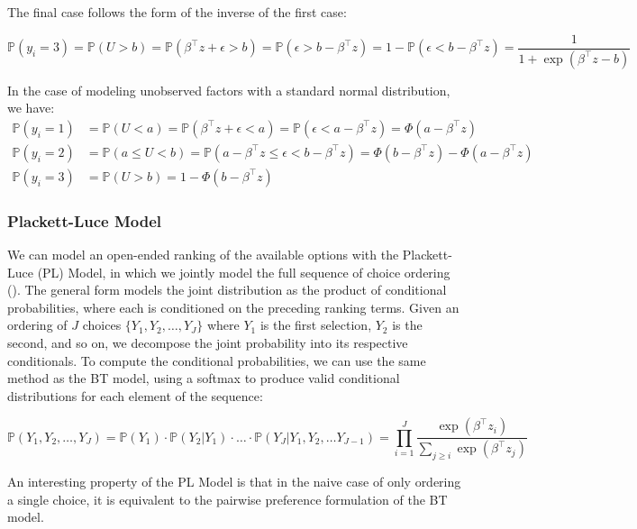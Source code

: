 \documentclass[
  letterpaper,
  numbers=noenddot,
  DIV=11]{scrreprt}
\theoremstyle{definition}
\theoremstyle{plain}
\theoremstyle{plain}
\theoremstyle{remark}
\begin{document}
The final case follows the form of the inverse of the first case:

\[\mathbb{P}(y_i = 3) = \mathbb{P}(U > b) = \mathbb{P}(\beta^\top z + \epsilon > b ) = \mathbb{P}( \epsilon > b - \beta^\top z) = 1 - \mathbb{P}( \epsilon < b - \beta^\top z) = \frac{1}{1 + \exp(\beta^\top z - b)}\]

In the case of modeling unobserved factors with a standard normal
distribution, we have: \[
\begin{split}
    \mathbb{P}(y_i = 1) & = \mathbb{P}(U < a) = \mathbb{P}(\beta^\top z + \epsilon < a ) = \mathbb{P}( \epsilon < a - \beta^\top z) = \Phi(a - \beta^\top z) \\
    \mathbb{P}(y_i = 2) & = \mathbb{P}(a \le U < b) 
    = \mathbb{P}(a - \beta^\top z \le \epsilon < b - \beta^\top z) = \Phi(b - \beta^\top z) - \Phi(a - \beta^\top z) \\
    \mathbb{P}(y_i = 3) & = \mathbb{P}(U > b) 
    = 1 - \Phi(b - \beta^\top z) 
\end{split}
\]

\subsubsection*{Plackett-Luce Model}\label{plackett-luce-model}

We can model an open-ended ranking of the available options with the
Plackett-Luce (PL) Model, in which we jointly model the full sequence of
choice ordering (). The
general form models the joint distribution as the product of conditional
probabilities, where each is conditioned on the preceding ranking terms.
Given an ordering of \(J\) choices \(\{Y_1, Y_2, \dots, Y_J\}\) where
\(Y_1\) is the first selection, \(Y_2\) is the second, and so on, we
decompose the joint probability into its respective conditionals. To
compute the conditional probabilities, we can use the same method as the
BT model, using a softmax to produce valid conditional distributions for
each element of the sequence:

\[
\mathbb{P}(Y_1, Y_2, \dots, Y_J) = \mathbb{P}(Y_1) \cdot \mathbb{P}(Y_2 | Y_1) \cdot \dots \cdot \mathbb{P}(Y_J | Y_1, Y_2, \dots Y_{J - 1}) = \prod_{i = 1}^J \frac{\exp(\beta^\top z_i)}{\sum_{j \ge i} \exp(\beta^\top z_j)}
\]

An interesting property of the PL Model is that in the naive case of
only ordering a single choice, it is equivalent to the pairwise
preference formulation of the BT model.
\end{document}
